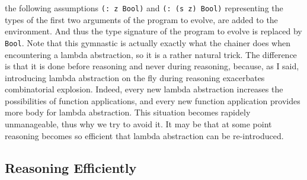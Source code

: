 \documentclass[]{report}
\begin{document}
\begin{enumerate}
the following assumptions \texttt{(: z Bool)}
and \texttt{(: (s z) Bool)} representing the types of the
first two arguments of the program to evolve, are added to the
environment.  And thus the type signature of the program to evolve is
replaced by \texttt{Bool}.  Note that this gymnastic is
actually exactly what the chainer does when encountering a lambda
abstraction, so it is a rather natural trick.  The difference is that
it is done before reasoning and never during reasoning, because, as I
said, introducing lambda abstraction on the fly during reasoning
exacerbates combinatorial explosion.  Indeed, every new lambda
abstraction increases the possibilities of function applications, and
every new function application provides more body for lambda
abstraction.  This situation becomes rapidely unmanageable, thus why
we try to avoid it.  It may be that at some point reasoning becomes so
efficient that lambda abstraction can be re-introduced.
\end{enumerate}

\subsection{Reasoning Efficiently}
\end{document}
